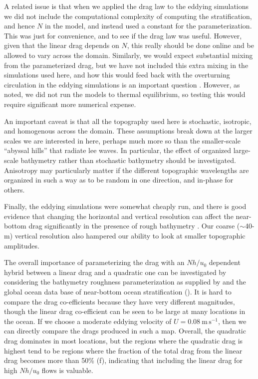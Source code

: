 \documentclass[twocol]{ametsocV5}
\begin{document}
A related issue is that when we applied the drag law to the eddying simulations we did not include the computational complexity of computing the stratification, and hence $N$ in the model, and instead used a constant for the parameterization.  This was just for convenience, and to see if the drag law was useful.  However, given that the linear drag depends on $N$, this really should be done online and be allowed to vary across the domain.   Similarly, we would expect substantial mixing from the parameterized drag, but we have not included this extra mixing in the simulations used here, and how this would feed back with the overturning circulation in the eddying simulations is an important question \citep{broadbridgeetal16}. However, as noted, we did not run the models to thermal equilibrium, so testing this would require significant more numerical expense.  

An important caveat is that all the topography used here is stochastic, isotropic, and homogenous across the domain.   These assumptions break down at the larger scales we are interested in here, perhaps much more so than the smaller-scale ``abyssal hills''  that radiate lee waves.  In particular, the effect of organized large-scale bathymetry rather than stochastic bathymetry should be investigated.  Anisotropy may particularly matter if the different topographic wavelengths are organized in such a way as to be random in one direction, and in-phase for others.  

Finally, the eddying simulations were somewhat cheaply run, and there is good evidence that changing the horizontal and vertical resolution can affect the near-bottom drag significantly in the presence of rough bathymetry \citep{klymak18}.  Our coarse ($\sim$40-m) vertical resolution also hampered our ability to look at smaller  topographic amplitudes. 

The overall importance of parameterizing the drag with an $Nh/u_0$ dependent hybrid between a linear drag and a quadratic one can be investigated by considering the bathymetry roughness parameterization as supplied by \citep{goffarbic10} and the global ocean data base of near-bottom ocean stratification ().  It is hard to compare the drag co-efficients because they have very different magnitudes, though the linear drag co-efficient can be seen to be large at many locations in the ocean.  If we choose a moderate eddying velocity of $U=0.08\ \mathrm{m\,s^{-1}}$, then we can directly compare the drags produced in such a map.  Overall, the quadratic drag dominates in most locations, but the regions where the quadratic drag is highest tend to be regions where the fraction of the total drag from the linear drag becomes more than 50\% (f), indicating that including the linear drag for high $Nh/u_0$ flows is valuable.  
\end{document}
